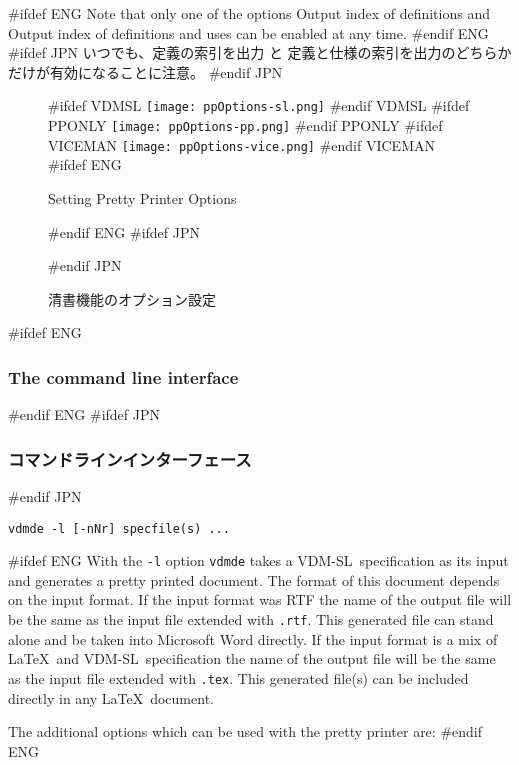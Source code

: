 \documentclass[\pformat,12pt]{article}
\newcommand{\vdmslpp}{VDM-SL}
\newcommand{\vdmde}{vdmde}
\newcommand{\vdmslpp}{VDM++}
\newcommand{\vdmde}{vppde}
\newcommand{\guicmd}[1]{{\sf #1}}
\newcommand{\guicmd}[1]{{\gt #1}}
\begin{document}
#ifdef ENG
Note that only one of the options {\sf Output index of definitions}
  and {\sf Output index of definitions and uses} can be enabled at any
  time.
#endif ENG
#ifdef JPN
いつでも、\guicmd{定義の索引を出力} と \guicmd{定義と仕様の索引を出力}のどちらか
だけが有効になることに注意。
#endif JPN


\begin{figure}[tbh]
\begin{center}
#ifdef VDMSL
\texttt{[image: ppOptions-sl.png]}
#endif VDMSL
#ifdef PPONLY
\texttt{[image: ppOptions-pp.png]}
#endif PPONLY
#ifdef VICEMAN
\texttt{[image: ppOptions-vice.png]}
#endif VICEMAN
#ifdef ENG
\caption{Setting Pretty Printer Options}
#endif ENG
#ifdef JPN
\caption{清書機能のオプション設定}
#endif JPN
\label{fig:optpp}
\end{center}
\end{figure}

#ifdef ENG
\subsubsection{The command line interface} \label{vdm2tex}
#endif ENG
#ifdef JPN
\subsubsection{コマンドラインインターフェース} \label{vdm2tex}
#endif JPN

{\tt \vdmde\ -l [-nNr] specfile(s) ...}

\vspace{0.5cm}

\noindent
#ifdef ENG
With the {\tt -l} option {\tt \vdmde} takes a \vdmslpp\
specification as its input and generates a pretty printed
document. The format of this document depends on the
input format. If the input format was RTF the name of the output file
will be the same as the input file extended with {\tt .rtf}. This
generated file can stand alone and be taken into Microsoft Word
directly. If the input format is a mix of \LaTeX\ and \vdmslpp\ 
specification the name of the output file will be the same as the
input file extended with {\tt .tex}. This generated file(s) can be
included directly in any \LaTeX\ document.

The additional options which can be used with the pretty printer are:
#endif ENG
\end{document}
